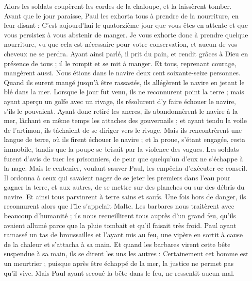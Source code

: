 \begin{multicols}{2}
{{{Alors les soldats coupèrent les cordes de la chaloupe, et la laissèrent tomber.
Avant que le jour paraisse, Paul les exhorta tous à prendre de la nourriture, en leur disant : C'est aujourd'hui le quatorzième jour que vous êtes en attente et que vous persistez à vous abstenir de manger.
Je vous exhorte donc à prendre quelque nourriture, vu que cela est nécessaire pour votre conservation, et aucun de vos cheveux ne se perdra.
Ayant ainsi parlé, il prit du pain, et rendit grâces à Dieu en présence de tous ; il le rompit et se mit à manger.
Et tous, reprenant courage, mangèrent aussi.
Nous étions dans le navire deux cent soixante-seize personnes.
Quand ils eurent mangé jusqu'à être rassasiés, ils allégèrent le navire en jetant le blé dans la mer.
Lorsque le jour fut venu, ils ne reconnurent point la terre ; mais ayant aperçu un golfe avec un rivage, ils résolurent d'y faire échouer le navire, s'ils le pouvaient.
Ayant donc retiré les ancres, ils abandonnèrent le navire à la mer, lâchant en même temps les attaches des gouvernails ; et ayant tendu la voile de l'artimon, ils tâchaient de se diriger vers le rivage.
Mais ils rencontrèrent une langue de terre, où ils firent échouer le navire ; et la proue, s'étant engagée, resta immobile, tandis que la poupe se brisait par la violence des vagues.
Les soldats furent d'avis de tuer les prisonniers, de peur que quelqu'un d'eux ne s'échappe à la nage.
Mais le centenier, voulant sauver Paul, les empêcha d'exécuter ce conseil. Il ordonna à ceux qui savaient nager de se jeter les premiers dans l'eau pour gagner la terre,
et aux autres, de se mettre sur des planches ou sur des débris du navire. Et ainsi tous parvinrent à terre sains et saufs.
\VerseOne{}Une fois hors de danger, ils reconnurent alors que l'île s'appelait Malte.
Les barbares nous traitèrent avec beaucoup d'humanité ; ils nous recueillirent tous auprès d'un grand feu, qu'ils avaient allumé parce que la pluie tombait et qu'il faisait très froid.
Paul ayant ramassé un tas de broussailles et l'ayant mis au feu, une vipère en sortit à cause de la chaleur et s'attacha à sa main.
Et quand les barbares virent cette bête suspendue à sa main, ils se dirent les uns les autres : Certainement cet homme est un meurtrier ; puisque après être échappé de la mer, la justice ne permet pas qu'il vive. 
Mais Paul ayant secoué la bête dans le feu, ne ressentit aucun mal.
}}}
\end{multicols}
